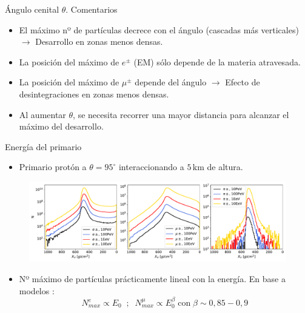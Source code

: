 \documentclass{beamer}
\begin{document}
\begin{frame}{Ángulo cenital $\theta$. Comentarios}
	\begin{itemize}
		\item El máximo nº de partículas decrece con el ángulo (cascadas más verticales) $\rightarrow$ Desarrollo en zonas menos densas.
		\item La posición del máximo de $e^\pm$ (EM) sólo depende de la materia atravesada.
		\item La posición del máximo de $\mu^\pm$ depende del ángulo $\rightarrow$ Efecto de desintegraciones en zonas menos densas.
		\item Al aumentar $\theta$, se necesita recorrer una mayor distancia para alcanzar el máximo del desarrollo.
	\end{itemize}	
\end{frame}
\begin{frame}{Energía del primario}
		\begin{itemize}
		\item Primario protón a $\theta = 95^\circ$ interaccionando a $5\,\mathrm{km}$ de altura.
	\end{itemize}
	\begin{figure}[H]
		\centering
		\includegraphics[width=1\linewidth]{figures/cascadas/upgoing_p_varE_95deg_5km_v3}
	\end{figure}
\begin{itemize}
	\item Nº máximo de partículas prácticamente lineal con la energía. En base a modelos \cite{matthews2005heitler}:
	\begin{equation*}
			N_{max}^{e}\propto E_0\;\;;\;\;N_{max}^{\mu}\propto E_0^\beta\;\text{con}\;\beta\sim0,85-0,9
	\end{equation*}
\end{itemize}
\end{frame}
\end{document}
